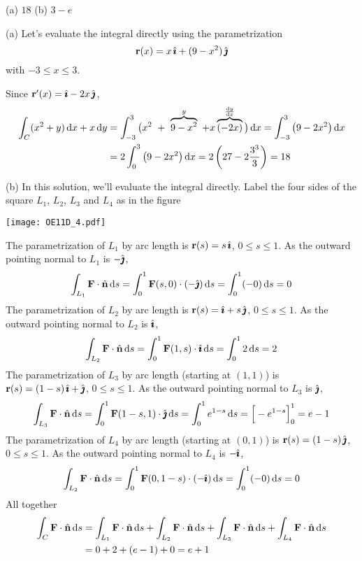 \begin{answer} 
(a) $18$\qquad
(b) $3-e$
\end{answer}

\begin{solution} (a)
Let's evaluate the integral directly using the parametrization
\begin{equation*}
\mathbf{r}(x) = x\,\hat{\pmb{\imath}} +(9-x^2)\,\hat{\pmb{\jmath}}
\end{equation*}
with $-3\le x \le 3$.

Since $\mathbf{r}'(x) = \hat{\pmb{\imath}} -2x\,\hat{\pmb{\jmath}}$,
\begin{align*}
\int_C (x^2 + y)\,\dee{x} + x\,\dee{y}
&=\int_{-3}^3 \big(x^2\ +\  \overbrace{9-x^2}^{y}\ 
          +x\overbrace{(-2x)}^{\diff{y}{x}}\big)\,\dee{x}
=\int_{-3}^3 \big(9-2x^2\big)\,\dee{x} \\
&=2\int_0^3 \big(9-2x^2\big)\,\dee{x}
=2\left(27-2\frac{3^3}{3}\right)
=18
\end{align*}

\noindent (b)  In this solution, we'll evaluate the
integral directly. Label the four sides of the square $L_1$, $L_2$, $L_3$ and
$L_4$ as in the figure

 \begin{center}
       \texttt{[image: OE11D\_4.pdf]}
\end{center}

The parametrization of $L_1$ by arc length is $\mathbf{r}(s) = s\,\hat{\pmb{\imath}}$, $0\le s\le 1$.
As the outward pointing normal to $L_1$ is $-\hat{\pmb{\jmath}}$,
\begin{align*}
\int_{L_1} \mathbf{F} \cdot\hat{\mathbf{n}}\, \mathrm{d}s
=\int_0^1 \mathbf{F}(s,0) \cdot(-\hat{\pmb{\jmath}})\, \mathrm{d}s
=\int_0^1 (-0)\, \mathrm{d}s
=0
\end{align*}
The parametrization of $L_2$ by arc length is $\mathbf{r}(s) = \hat{\pmb{\imath}}+s\,\hat{\pmb{\jmath}}$, 
$0\le s\le 1$. As the outward pointing normal to $L_2$ is $\hat{\pmb{\imath}}$,
\begin{align*}
\int_{L_2} \mathbf{F} \cdot\hat{\mathbf{n}}\, \mathrm{d}s
=\int_0^1 \mathbf{F}(1,s) \cdot \hat{\pmb{\imath}}\, \mathrm{d}s
=\int_0^1 2\, \mathrm{d}s
=2
\end{align*}
The parametrization of $L_3$ by arc length (starting at $(1,1)$)
is $\mathbf{r}(s) = (1-s)\,\hat{\pmb{\imath}}+\hat{\pmb{\jmath}}$, $0\le s\le 1$.
As the outward pointing normal to $L_3$ is $\hat{\pmb{\jmath}}$,
\begin{align*}
\int_{L_3} \mathbf{F} \cdot\hat{\mathbf{n}}\, \mathrm{d}s
=\int_0^1 \mathbf{F}(1-s,1) \cdot\hat{\pmb{\jmath}}\, \mathrm{d}s
=\int_0^1 e^{1-s}\, \mathrm{d}s
=\Big[-e^{1-s}\Big]_0^1
=e-1
\end{align*}
The parametrization of $L_4$ by arc length (starting at $(0,1)$)
is $\mathbf{r}(s) = (1-s)\,\hat{\pmb{\jmath}}$,  $0\le s\le 1$. As the outward pointing 
normal to $L_4$ is $-\hat{\pmb{\imath}}$,
\begin{align*}
\int_{L_2} \mathbf{F} \cdot\hat{\mathbf{n}}\, \mathrm{d}s
=\int_0^1 \mathbf{F}(0,1-s) \cdot(- \hat{\pmb{\imath}})\, \mathrm{d}s
=\int_0^1 (-0)\, \mathrm{d}s
=0
\end{align*}
All together
\begin{align*}
\int_C \vF \cdot\hn\, \dee{s}
&= \int_{L_1} \vF \cdot\hn\, \dee{s}
   +\int_{L_2} \vF \cdot\hn\, \dee{s} %
   +\int_{L_3} \vF \cdot\hn\, \dee{s}
   +\int_{L_4} \vF \cdot\hn\, \dee{s}  \\
&= 0+2+(e-1) +0 
=e+1
\end{align*}



\end{solution}
